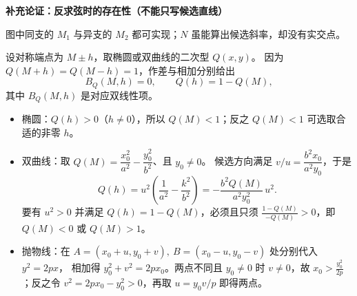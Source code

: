 \begin{proofbox}
\tcbbreak
\textbf{\textcolor{CProof}{补充论证：反求弦时的存在性（不能只写候选直线）}}
\begin{center}\end{center}
图中同支的 $M_1$ 与异支的 $M_2$ 都可实现；$N$ 虽能算出候选斜率，却没有实交点。

设对称端点为 $M\pm h$，取椭圆或双曲线的二次型 $Q(x,y)$。
因为 $Q(M+h)=Q(M-h)=1$，作差与相加分别给出
\[
B_Q(M,h)=0,\qquad Q(h)=1-Q(M),
\]
其中 $B_Q(M,h)$ 是对应双线性项。
\begin{itemize}[leftmargin=*,itemsep=0.4em,topsep=0.25em]
\item 椭圆：$Q(h)>0$（$h\ne0$），所以 $Q(M)<1$；反之 $Q(M)<1$ 可选取合适的非零 $h$。
\item 双曲线：取 $Q(M)=\dfrac{x_0^2}{a^2}-\dfrac{y_0^2}{b^2}$、且 $y_0\ne0$。
候选方向满足 $v/u=\dfrac{b^2x_0}{a^2y_0}$，于是
\[
Q(h)=u^2\left(\frac1{a^2}-\frac{k^2}{b^2}\right)
=-\frac{b^2Q(M)}{a^2y_0^2}\,u^2.
\]
要有 $u^2>0$ 并满足 $Q(h)=1-Q(M)$，必须且只须
$\displaystyle \frac{1-Q(M)}{-Q(M)}>0$，即 $Q(M)<0$ 或 $Q(M)>1$。
\item 抛物线：在 $A=(x_0+u,y_0+v),\ B=(x_0-u,y_0-v)$ 处分别代入 $y^2=2px$，
相加得 $y_0^2+v^2=2px_0$。两点不同且 $y_0\ne0$ 时 $v\ne0$，故
$\displaystyle x_0>\frac{y_0^2}{2p}$；反之令 $v^2=2px_0-y_0^2>0$，再取 $u=y_0v/p$ 即得两点。
\end{itemize}

\end{proofbox}
